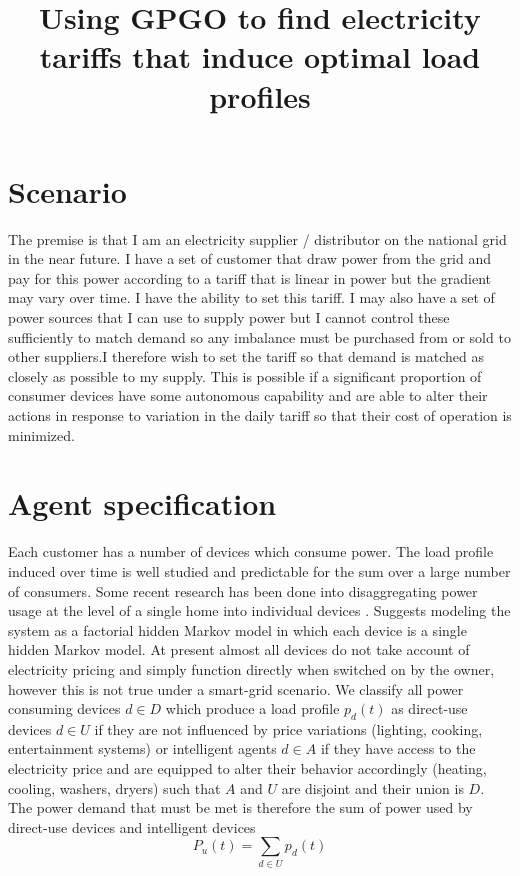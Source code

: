 \documentclass[11pt]{article}
\title{\textbf{Using GPGO to find electricity tariffs that
induce optimal load profiles
}}
\author{}
\date{}
\begin{document}
\maketitle


\section{Scenario}

The premise is that I am an electricity supplier / distributor on the national grid
in the near future. I have a set of customer that draw power from the grid and
pay for this power according to a tariff that is linear in power but the gradient
may vary over time. I have the ability to set this tariff. I may also have a
set of power sources that I can use to supply power but I cannot control these
sufficiently to match demand so any imbalance must be purchased from or sold to other suppliers.I therefore wish to set the tariff so that demand is matched as closely as possible to my supply. This is possible if a significant
proportion of consumer devices have some autonomous capability and are able
to alter their actions in response to variation in the daily tariff so that their cost
of operation is minimized.

\section{Agent specification}
Each customer has a number of devices which consume power. The load profile induced over time is well studied and predictable for the sum over a large number of consumers. Some recent research has been done into disaggregating power usage at the level of a single home into individual devices \cite{kolter2011redd} \cite{anderson2012blued}. \cite{kolter2011redd} Suggests modeling the system as a factorial hidden Markov model in which each device is a single hidden Markov model. At present almost all devices do not take account of electricity pricing and simply function directly when switched on by the owner, however this is not true under a smart-grid scenario. We classify all power consuming devices $d \in D$ which produce a load profile $p_{d}(t)$ as direct-use devices $d \in U$ if they are not influenced by price variations (lighting, cooking, entertainment systems) or intelligent agents $d \in A$ if they have access to the electricity price and are equipped to alter their behavior accordingly (heating, cooling, washers, dryers) such that $A$ and $U$ are disjoint and their union is $D$. The power demand that must be met is therefore the sum of power used by direct-use devices and intelligent devices
\begin{equation}
P_{u} (t) = \sum_{d \in U} p_{d} (t)
\end{equation}
\end{document}
